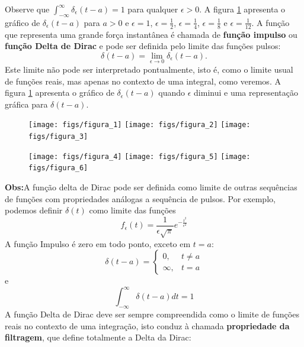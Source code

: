 \documentclass[a4paper,10pt]{book}
\begin{document}
 Observe que $\int_{-\infty}^\infty\delta_\epsilon(t-a)=1$ para qualquer $\epsilon>0$. A figura \ref{fig_delta_dirac} apresenta o gráfico de $\delta_\epsilon(t-a)$ para $a>0$ e $\epsilon=1$, $\epsilon=\frac{1}{2}$, $\epsilon=\frac{1}{4}$, $\epsilon=\frac{1}{8}$ e $\epsilon=\frac{1}{12}$.
 A função que representa uma grande força instantânea é chamada de {\bf função impulso} ou {\bf função Delta de Dirac} e pode ser definida pelo limite das funções pulsos:
 \begin{equation}
 \delta(t-a)=\lim_{\epsilon\to 0}\delta_\epsilon(t-a).
 \end{equation}
 Este limite não pode ser interpretado pontualmente, isto é, como o limite usual de funções reais, mas apenas no contexto de uma integral, como veremos.
 A figura \ref{fig_delta_dirac} apresenta o gráfico de $\delta_\epsilon(t-a)$ quando $\epsilon$ diminui e uma representação gráfica para $\delta(t-a)$.
% 
%   
 \begin{figure}[!ht]
 \begin{center}
% 
 \texttt{[image: figs/figura\_1]}\hspace{20pt}
 \texttt{[image: figs/figura\_2]}\hspace{20pt}
 \texttt{[image: figs/figura\_3]}
 
 \texttt{[image: figs/figura\_4]}\hspace{20pt}
 \texttt{[image: figs/figura\_5]}\hspace{20pt}
 \texttt{[image: figs/figura\_6]}
 \end{center}
 \caption{\label{fig_delta_dirac}}
 \end{figure}
% 
 {\bf Obs:}A função delta de Dirac pode ser definida como limite de outras sequências de funções com propriedades análogas a sequência de pulsos. Por exemplo, podemos definir $\delta(t)$ como limite das funções
 \begin{equation}
 f_\epsilon(t)=\frac{1}{\epsilon\sqrt{\pi}}e^{-\frac{t^2}{\epsilon^2}}
 \end{equation}
% 
% 
% 
 A função Impulso é zero em todo ponto, exceto em $t=a$:
 \begin{equation}
 \delta(t-a)=\left\{\begin{array}{ll}0,&t\neq a\\\infty,&t=a  \end{array}\right.
 \end{equation}
 e
 \begin{equation}
 \int_{-\infty}^\infty\delta(t-a)dt=1
 \end{equation}
 A função Delta de Dirac deve ser sempre compreendida como o limite de funções reais no contexto de uma integração, isto conduz à chamada  {\bf propriedade da filtragem}, que define totalmente a Delta da Dirac:
\end{document}
